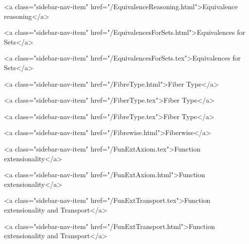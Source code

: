       
    
      
        
          <a class="sidebar-nav-item" href="/EquivalenceReasoning.html">Equivalence reasoning</a>
        
      
    
      
        
          <a class="sidebar-nav-item" href="/EquivalencesForSets.html">Equivalences for Sets</a>
        
      
    
      
        
          <a class="sidebar-nav-item" href="/EquivalencesForSets.tex">Equivalences for Sets</a>
        
      
    
      
        
          <a class="sidebar-nav-item" href="/FibreType.html">Fiber Type</a>
        
      
    
      
        
          <a class="sidebar-nav-item" href="/FiberType.tex">Fiber Type</a>
        
      
    
      
        
          <a class="sidebar-nav-item" href="/FibreType.tex">Fiber Type</a>
        
      
    
      
        
          <a class="sidebar-nav-item" href="/Fibrewise.html">Fiberwise</a>
        
      
    
      
        
          <a class="sidebar-nav-item" href="/FunExtAxiom.tex">Function extensionality</a>
        
      
    
      
        
          <a class="sidebar-nav-item" href="/FunExtAxiom.html">Function extensionality</a>
        
      
    
      
        
          <a class="sidebar-nav-item" href="/FunExtTransport.tex">Function extensionality and Transport</a>
        
      
    
      
        
          <a class="sidebar-nav-item" href="/FunExtTransport.html">Function extensionality and Transport</a>
        
